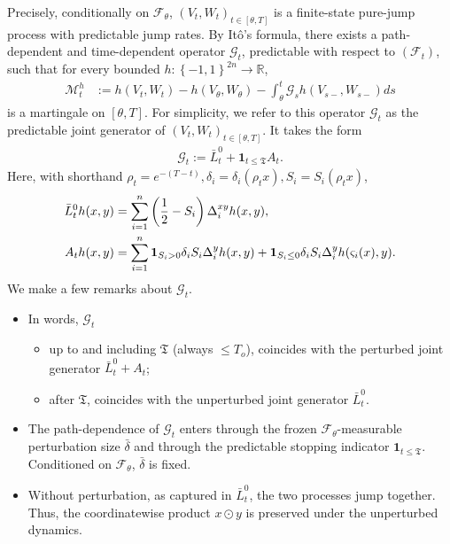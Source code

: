 \documentclass[11pt]{article}
\newcommand{\flip}{\varsigma}
\newcommand{\cM}{\mathcal{M}}
\newcommand{\bdelta}{\bar{\delta}}
\newcommand{\stopT}{{\boldsymbol{\mathfrak{T}}}}
\newcommand{\sF}{\mathscr{F}}
\newcommand{\uV}{V}
\newcommand{\uW}{W}
\newcommand{\cG}{\mathcal{G}}
\newcommand{\To}{{T_o}}
\newcommand{\jL}{\bar{L}}
\theoremstyle{named}
\theoremstyle{plain}
\newcommand{\defn}{:=}
\newcommand{\real}{\ensuremath{\mathbb{R}}}
\newcommand{\parenth}[1]{\left( #1 \right)}
\newcommand{\braces}[1]{\left\{ #1 \right \}}
\begin{document}
Precisely, conditionally on $\sF_\theta$, $(\uV_t, \uW_t)_{t \in [\theta, T]}$ is a finite-state pure-jump process with predictable jump rates. By It\^o's formula, there exists a path-dependent and time-dependent operator $\cG_t$, predictable with respect to $(\sF_t)$, such that for every bounded $h: \braces{-1, 1}^{2n} \to \real$, 
\begin{align*}
  \cM_t^{h} &\defn h(\uV_t, \uW_t) - h(\uV_\theta, \uW_\theta) - \int_\theta^t \cG_s h(\uV_{s-}, \uW_{s-}) ds
\end{align*}
is a martingale on $[\theta, T]$. For simplicity, we refer to this operator $\cG_t$ as the predictable joint generator of $(\uV_t, \uW_t)_{t \in [\theta, T]}$. It takes the form
\begin{align}
  \label{eq:def_joint_generator}
  \cG_t \defn \jL^0_t + \mathbf{1}_{t \leq \stopT} A_t. 
\end{align}
Here, with shorthand $\rho_t = e^{-(T-t)}, \delta_i = \delta_i(\rho_t x), S_i = S_i(\rho_t x)$,
\begin{align}
  \label{eq:def_At}
  \jL_t^0 h(x, y) &= \sum_{i=1}^n  \parenth{\frac12 - S_i } \Delta_i^{xy} h(x, y), \notag \\
  A_t h (x, y) &= \sum_{i=1}^n  \mathbf{1}_{S_i > 0}  \delta_i  S_i \Delta_i^{y} h(x, y) + \mathbf{1}_{S_i \leq 0} \delta_i  S_i \Delta_i^{y} h(\flip_i(x), y)  . 
\end{align}
We make a few remarks about $\cG_t$. 
\begin{itemize}
  \item In words, $\cG_t$
  \begin{itemize}
    \item up to and including $\stopT$ (always $\leq \To$), coincides with the perturbed joint generator $\jL_t^0 + A_t$;
    \item after $\stopT$, coincides with the unperturbed joint generator $\jL_t^0$.
  \end{itemize}
  \item The path-dependence of $\cG_t$ enters through the frozen $\sF_\theta$-measurable perturbation size $\bdelta$ and through the predictable stopping indicator $\mathbf{1}_{t\leq\stopT}$. Conditioned on $\sF_\theta$, $\bdelta$ is fixed.
  \item Without perturbation, as captured in $\jL_t^0$, the two processes jump together. Thus, the coordinatewise product $x \odot y$ is preserved under the unperturbed dynamics.
\end{itemize}
\end{document}
